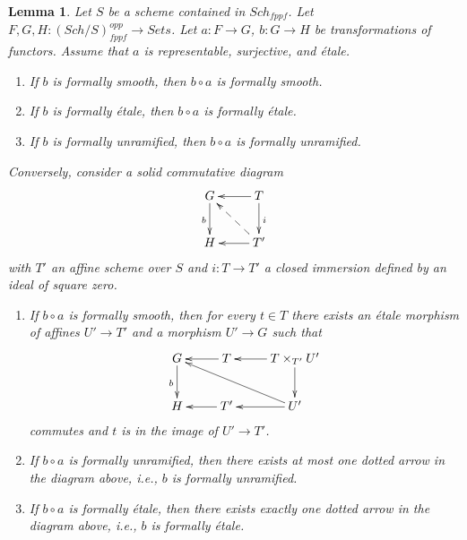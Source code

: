 \documentclass[10pt,a4paper]{amsart}
\theoremstyle{plain}
\newtheorem{lemma}[subsection]{Lemma}
\theoremstyle{definition}
\theoremstyle{remark}
\numberwithin{equation}{subsection}
\def\Sch{\mathit{Sch}}
\begin{document}
\begin{lemma}
\label{lemma-etale-on-top}
Let $S$ be a scheme contained in $\Sch_{fppf}$.
Let $F, G, H : (\Sch/S)_{fppf}^{opp} \to \textit{Sets}$.
Let $a : F \to G$, $b : G \to H$ be transformations of functors.
Assume that $a$ is representable, surjective, and \'etale.
\begin{enumerate}
\item If $b$ is formally smooth, then $b \circ a$ is formally smooth.
\item If $b$ is formally \'etale, then $b \circ a$ is formally \'etale.
\item If $b$ is formally unramified, then $b \circ a$ is formally unramified.
\end{enumerate}
Conversely, consider a solid commutative diagram
$$
\xymatrix{
G \ar[d]_b & T \ar[d]^i \ar[l] \\
H & T' \ar[l] \ar@{-->}[lu]
}
$$
with $T'$ an affine scheme over $S$
and $i : T \to T'$ a closed immersion defined by an ideal of square zero.
\begin{enumerate}
\item[(4)] If $b \circ a$ is formally smooth, then for every $t \in T$
there exists an \'etale morphism of affines $U' \to T'$ and a morphism
$U' \to G$ such that
$$
\xymatrix{
G \ar[d]_b & T \ar[l] & T \times_{T'} U' \ar[d] \ar[l]\\
H & T' \ar[l] & U' \ar[llu] \ar[l]
}
$$
commutes and $t$ is in the image of $U' \to T'$.
\item[(5)] If $b \circ a$ is formally unramified, then there exists at most
one dotted arrow in the diagram above, i.e., $b$ is formally unramified.
\item[(6)] If $b \circ a$ is formally \'etale, then there exists exactly one
dotted arrow in the diagram above, i.e., $b$ is formally \'etale.
\end{enumerate}
\end{lemma}
\end{document}
